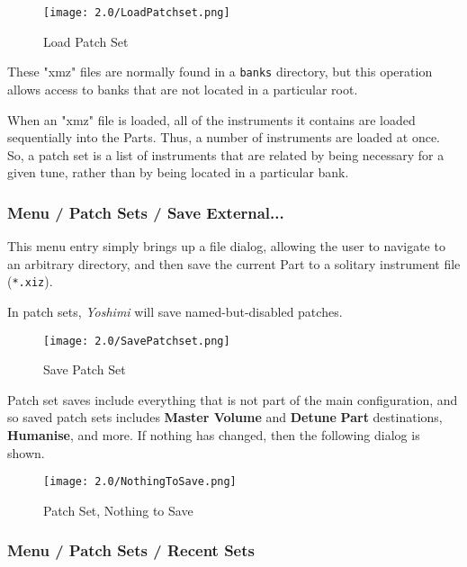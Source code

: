 \begin{figure}[H]
   \centering
   \texttt{[image: 2.0/LoadPatchset.png]}
   \caption{Load Patch Set}
   \label{fig:yoshimi_menu_open_parameters}
\end{figure}

   These "xmz" files are normally found in a \texttt{banks} directory, but this
   operation allows access to banks that are not located in a particular root.

   When an "xmz" file is loaded, all of the instruments it contains are
   loaded sequentially into the Parts.  Thus, a number of instruments are loaded
   at once.  So, a patch set is a list of instruments that are related by
   being necessary for a given tune, rather than by being located in a
   particular bank.

\subsubsection{Menu / Patch Sets / Save External...}
\label{subsubsec:menu_patch_sets_save}

   This menu entry simply brings up a file dialog, allowing the user to
   navigate to an arbitrary directory, and then save the current Part
   to a solitary instrument file (\texttt{*.xiz}).

   In patch sets, \textsl{Yoshimi} will save named-but-disabled patches.

\begin{figure}[H]
   \centering
   \texttt{[image: 2.0/SavePatchset.png]}
   \caption{Save Patch Set}
   \label{fig:yoshimi_menu_save_parameters}
\end{figure}

   Patch set saves include everything that is not part of the main
   configuration, and so saved patch sets
   includes \textbf{Master Volume} and \textbf{Detune}
   \textbf{Part} destinations, \textbf{Humanise},
   and more.
   If nothing has changed, then the following dialog is shown.

\begin{figure}[H]
   \centering
   \texttt{[image: 2.0/NothingToSave.png]}
   \caption{Patch Set, Nothing to Save}
   \label{fig:yoshimi_menu_nothing_to_save_parameters}
\end{figure}

\subsubsection{Menu / Patch Sets / Recent Sets}
\label{subsubsec:menu_patch_sets_recent_sets}

